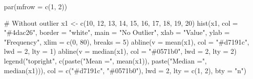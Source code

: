 \documentclass[
  11pt,
  a4paper,
  oneside,
  open=any]{scrbook}
\newenvironment{Shaded}{\begin{snugshade}}{\end{snugshade}}
\newcommand{\AttributeTok}[1]{\textcolor[rgb]{0.40,0.45,0.13}{#1}}
\newcommand{\CommentTok}[1]{\textcolor[rgb]{0.37,0.37,0.37}{#1}}
\newcommand{\DecValTok}[1]{\textcolor[rgb]{0.68,0.00,0.00}{#1}}
\newcommand{\FunctionTok}[1]{\textcolor[rgb]{0.28,0.35,0.67}{#1}}
\newcommand{\NormalTok}[1]{\textcolor[rgb]{0.00,0.23,0.31}{#1}}
\newcommand{\OtherTok}[1]{\textcolor[rgb]{0.00,0.23,0.31}{#1}}
\newcommand{\StringTok}[1]{\textcolor[rgb]{0.13,0.47,0.30}{#1}}
\begin{document}
\begin{Shaded}
\begin{Highlighting}[]
\FunctionTok{par}\NormalTok{(}\AttributeTok{mfrow =} \FunctionTok{c}\NormalTok{(}\DecValTok{1}\NormalTok{, }\DecValTok{2}\NormalTok{))}

\CommentTok{\# Without outlier}
\NormalTok{x1 }\OtherTok{\textless{}{-}} \FunctionTok{c}\NormalTok{(}\DecValTok{10}\NormalTok{, }\DecValTok{12}\NormalTok{, }\DecValTok{13}\NormalTok{, }\DecValTok{14}\NormalTok{, }\DecValTok{15}\NormalTok{, }\DecValTok{16}\NormalTok{, }\DecValTok{17}\NormalTok{, }\DecValTok{18}\NormalTok{, }\DecValTok{19}\NormalTok{, }\DecValTok{20}\NormalTok{)}
\FunctionTok{hist}\NormalTok{(x1, }\AttributeTok{col =} \StringTok{"\#4dac26"}\NormalTok{, }\AttributeTok{border =} \StringTok{"white"}\NormalTok{, }\AttributeTok{main =} \StringTok{"No Outlier"}\NormalTok{,}
     \AttributeTok{xlab =} \StringTok{"Value"}\NormalTok{, }\AttributeTok{ylab =} \StringTok{"Frequency"}\NormalTok{, }\AttributeTok{xlim =} \FunctionTok{c}\NormalTok{(}\DecValTok{0}\NormalTok{, }\DecValTok{80}\NormalTok{), }\AttributeTok{breaks =} \DecValTok{5}\NormalTok{)}
\FunctionTok{abline}\NormalTok{(}\AttributeTok{v =} \FunctionTok{mean}\NormalTok{(x1),   }\AttributeTok{col =} \StringTok{"\#d7191c"}\NormalTok{, }\AttributeTok{lwd =} \DecValTok{2}\NormalTok{, }\AttributeTok{lty =} \DecValTok{1}\NormalTok{)}
\FunctionTok{abline}\NormalTok{(}\AttributeTok{v =} \FunctionTok{median}\NormalTok{(x1), }\AttributeTok{col =} \StringTok{"\#0571b0"}\NormalTok{, }\AttributeTok{lwd =} \DecValTok{2}\NormalTok{, }\AttributeTok{lty =} \DecValTok{2}\NormalTok{)}
\FunctionTok{legend}\NormalTok{(}\StringTok{"topright"}\NormalTok{, }\FunctionTok{c}\NormalTok{(}\FunctionTok{paste}\NormalTok{(}\StringTok{"Mean ="}\NormalTok{, }\FunctionTok{mean}\NormalTok{(x1)),}
                     \FunctionTok{paste}\NormalTok{(}\StringTok{"Median ="}\NormalTok{, }\FunctionTok{median}\NormalTok{(x1))),}
       \AttributeTok{col =} \FunctionTok{c}\NormalTok{(}\StringTok{"\#d7191c"}\NormalTok{, }\StringTok{"\#0571b0"}\NormalTok{), }\AttributeTok{lwd =} \DecValTok{2}\NormalTok{, }\AttributeTok{lty =} \FunctionTok{c}\NormalTok{(}\DecValTok{1}\NormalTok{, }\DecValTok{2}\NormalTok{), }\AttributeTok{bty =} \StringTok{"n"}\NormalTok{)}


\end{Highlighting}
\end{Shaded}
\end{document}
